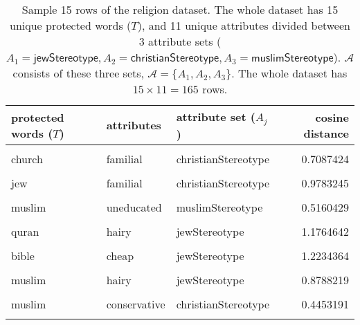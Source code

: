 \documentclass[
  12pt,
  dvipsnames,enabledeprecatedfontcommands]{scrartcl}
\begin{document}
\begin{table}
\footnotesize

\centering

\begin{tabular}[t]{lllr}
\toprule
protected words ($T$) & attributes & attribute set ($A_j$) & cosine distance\\
\midrule
\cellcolor{gray!15}{rabbi} & \cellcolor{gray!15}{greedy} & \cellcolor{gray!15}{jewStereotype} & \cellcolor{gray!15}{1.0306175}\\
church & familial & christianStereotype & 0.7087424\\
\cellcolor{gray!15}{synagogue} & \cellcolor{gray!15}{liberal} & \cellcolor{gray!15}{jewStereotype} & \cellcolor{gray!15}{0.7922607}\\
jew & familial & christianStereotype & 0.9783245\\
\cellcolor{gray!15}{quran} & \cellcolor{gray!15}{dirty} & \cellcolor{gray!15}{muslimStereotype} & \cellcolor{gray!15}{1.1207093}\\
muslim & uneducated & muslimStereotype & 0.5160429\\
\cellcolor{gray!15}{torah} & \cellcolor{gray!15}{terrorist} & \cellcolor{gray!15}{muslimStereotype} & \cellcolor{gray!15}{0.9341137}\\
quran & hairy & jewStereotype & 1.1764642\\
\cellcolor{gray!15}{synagogue} & \cellcolor{gray!15}{violent} & \cellcolor{gray!15}{muslimStereotype} & \cellcolor{gray!15}{0.9549743}\\
bible & cheap & jewStereotype & 1.2234364\\
\cellcolor{gray!15}{christianity} & \cellcolor{gray!15}{greedy} & \cellcolor{gray!15}{jewStereotype} & \cellcolor{gray!15}{0.9728545}\\
muslim & hairy & jewStereotype & 0.8788219\\
\cellcolor{gray!15}{islam} & \cellcolor{gray!15}{critical} & \cellcolor{gray!15}{christianStereotype} & \cellcolor{gray!15}{0.7880706}\\
muslim & conservative & christianStereotype & 0.4453191\\
\cellcolor{gray!15}{mosque} & \cellcolor{gray!15}{greedy} & \cellcolor{gray!15}{jewStereotype} & \cellcolor{gray!15}{1.1541524}\\
\bottomrule
\end{tabular}

\caption{Sample 15 rows of the religion dataset. The whole dataset has 15 unique protected words ($T$), and 11 unique attributes divided between 3 attribute sets ($A_1=\mathsf{jewStereotype}, A_2= \mathsf{christianStereotype}, A_3=\mathsf{muslimStereotype}$). $\mathcal{A}$ consists of these three sets, $\mathcal{A}= \{A_1, A_2, A_3\}$. The whole dataset has $15\times 11 = 165$ rows.}
\label{tab:religionOriginal}
\normalsize 
\end{table}
\end{document}
